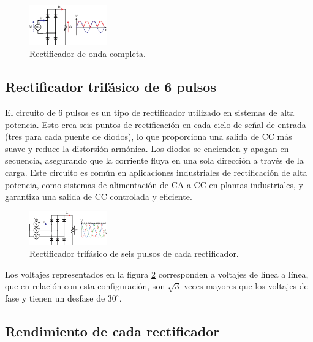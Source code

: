 \documentclass[isoft]{ssltexposter}
\begin{document}
\begin{poster}
\begin{figure}
    \centering
    \includegraphics[width=0.30\textwidth]{imagenes/rectificador_onda_completa.eps}
    \caption{Rectificador de onda completa.}
    \label{fig:rectificador_onda_completa}
\end{figure}


\subsection{Rectificador trifásico de 6 pulsos}

El circuito de 6 pulsos es un tipo de rectificador utilizado en sistemas de alta potencia.
Esto crea seis puntos de rectificación en cada ciclo de señal de entrada (tres para cada puente de diodos), lo que proporciona una salida de CC más suave y reduce la distorsión armónica.
Los diodos se encienden y apagan en secuencia, asegurando que la corriente fluya en una sola dirección a través de la carga.
Este circuito es común en aplicaciones industriales de rectificación de alta potencia, como sistemas de alimentación de CA a CC en plantas industriales, y garantiza una salida de CC controlada y eficiente.


\begin{figure}
    \centering
    \includegraphics[width=0.30\textwidth]{imagenes/rectificador_seis_pulsos.eps}
    \caption{Rectificador trifásico de seis pulsos de cada rectificador.}
    \label{fig:rectificador_seis_pulsos}
\end{figure}

Los voltajes representados en la figura \ref{fig:rectificador_seis_pulsos} corresponden a voltajes de línea a línea, que en relación con esta configuración, son $\sqrt{3}$ veces mayores que los voltajes de fase y tienen un desfase de $30^\circ$. 

\subsection{Rendimiento de cada rectificador}


\end{poster}
\end{document}
